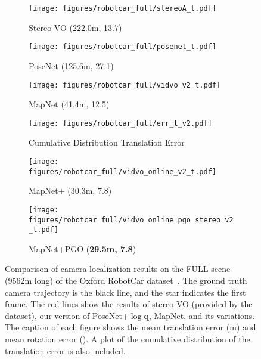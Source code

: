  \begin{figure*}
    \captionsetup[subfigure]{labelformat=empty}
    \centering
    \begin{subfigure}{0.32\linewidth}
        \centering
        \texttt{[image: figures/robotcar\_full/stereoA\_t.pdf]}
        \vspace{-1.5em}
        \caption{\small Stereo VO (222.0m, 13.7\degree)}
    \end{subfigure}
    \hfill
    \begin{subfigure}{0.32\linewidth}
        \centering
        \texttt{[image: figures/robotcar\_full/posenet\_t.pdf]}
        \vspace{-1.5em}
        \caption{\small PoseNet (125.6m, 27.1\degree)}
    \end{subfigure}
    \hfill
    \begin{subfigure}{0.32\linewidth}
        \centering
        \texttt{[image: figures/robotcar\_full/vidvo\_v2\_t.pdf]}
        \vspace{-1.5em}
        \caption{\small MapNet (41.4m, 12.5\degree)}
    \end{subfigure}

    \begin{subfigure}{0.32\linewidth}
        \centering
        \texttt{[image: figures/robotcar\_full/err\_t\_v2.pdf]}
        \vspace{-.5em}
        \caption{\small Cumulative Distribution Translation Error}
    \end{subfigure}
    \hfill
    \begin{subfigure}{0.32\linewidth}
        \centering
        \texttt{[image: figures/robotcar\_full/vidvo\_online\_v2\_t.pdf]}
        \vspace{-1.5em}
        \caption{\small MapNet+ (30.3m, 7.8\degree)}
    \end{subfigure}
    \hfill
    \begin{subfigure}{0.32\linewidth}
        \centering
        \texttt{[image: figures/robotcar\_full/vidvo\_online\_pgo\_stereo\_v2\_t.pdf]}
        \vspace{-1.5em}
        \caption{\small MapNet+PGO ({\bf 29.5m, 7.8\degree})}
    \end{subfigure}
    \vspace{-1em}
    \caption{\small Comparison of camera localization results on the FULL scene (9562m long) of the
    Oxford RobotCar dataset~\cite{RobotCarDatasetIJRR}. The ground truth camera trajectory
    is the black line, and the star indicates the first frame. The red lines show the
    results of stereo VO (provided by the dataset),
    our version of PoseNet+$\log\mathbf{q}$, MapNet, and its variations. The caption
    of each figure shows the mean translation error (m) and mean rotation error (\degree).
    A plot of the cumulative distribution of the translation error is also included.}
    \label{fig:map_compare_robotcar_full}
\end{figure*}

